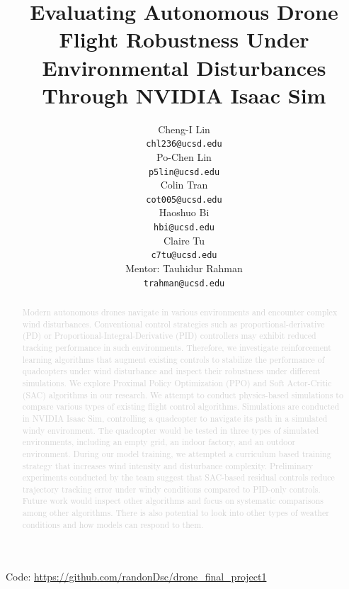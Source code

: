 \documentclass[12pt,letterpaper]{article}
\title{Evaluating Autonomous Drone Flight Robustness Under Environmental Disturbances Through NVIDIA Isaac Sim}
\author{Cheng-I Lin \\
  {\tt chl236@ucsd.edu} \\\And
  Po-Chen Lin \\
  {\tt p5lin@ucsd.edu} \\\And
  Colin Tran \\
  {\tt cot005@ucsd.edu} \\\And
  Haoshuo Bi \\
  {\tt hbi@ucsd.edu} \\\And
  Claire Tu \\
  {\tt c7tu@ucsd.edu} \\\And
  Mentor: Tauhidur Rahman \\
  {\tt trahman@ucsd.edu} \\}
\begin{document}
\maketitle



\begin{abstract}
    \textcolor{LightGrey}{Modern autonomous drones navigate in various environments and encounter complex wind disturbances. Conventional control strategies such as proportional-derivative (PD) or Proportional-Integral-Derivative (PID) controllers may exhibit reduced tracking performance in such environments. Therefore, we investigate reinforcement learning algorithms that augment existing controls to stabilize the performance of quadcopters under wind disturbance and inspect their robustness under different simulations. We explore Proximal Policy Optimization (PPO) and Soft Actor-Critic (SAC) algorithms in our research. We attempt to conduct physics-based simulations to compare various types of existing flight control algorithms. Simulations are conducted in NVIDIA Isaac Sim, controlling a quadcopter to navigate its path in a simulated windy environment. The quadcopter would be tested in three types of simulated environments, including an empty grid, an indoor factory, and an outdoor environment. During our model training, we attempted a curriculum based training strategy that increases wind intensity and disturbance complexity. Preliminary experiments conducted by the team suggest that SAC-based residual controls reduce trajectory tracking error under windy conditions compared to PID-only controls. Future work would inspect other algorithms and focus on systematic comparisons among other algorithms. There is also potential to look into other types of weather conditions and how models can respond to them.}
\end{abstract}


\begin{center}
Code: \url{https://github.com/randonDsc/drone_final_project1}
\end{center}

\maketoc
\clearpage

\end{document}
